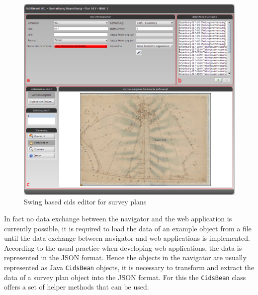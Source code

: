 \begin{figure}
	\centering	\includegraphics[width=1.0\textwidth]{./img/impl/survey_plan_editor_old.png}
	\caption{Swing based cids editor for survey plans}
	\label{fig:survey_plan_swing_editor}
\end{figure}

In fact no data exchange between the navigator and the web application is currently possible, it is required to load the data of an example object from a file until the data exchange between navigator and web applications is implemented.
According to the usual practice when developing web applications, the data is represented in the JSON format.
Hence the objects in the navigator are usually represented as Java \texttt{CidsBean} objects, it is necessary to transform and extract the data of a survey plan object into the JSON format.
For this the \texttt{CidsBean} class offers a set of helper methods that can be used.  






